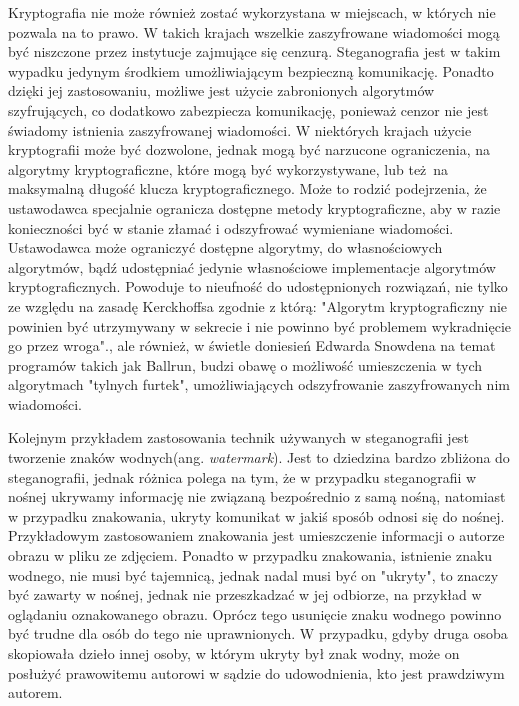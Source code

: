 \documentclass[a4paper, twoside, 12pt]{report}
\begin{document}
        Kryptografia nie może również zostać wykorzystana w miejscach, w których
        nie pozwala na to prawo.\cite{CRYPTOGRAFYLAW} W takich krajach wszelkie
        zaszyfrowane wiadomości mogą być niszczone przez instytucje zajmujące się
        cenzurą. Steganografia jest w takim
        wypadku jedynym środkiem umożliwiającym bezpieczną komunikację. Ponadto
        dzięki jej zastosowaniu, możliwe jest użycie zabronionych algorytmów szyfrujących,
        co dodatkowo zabezpiecza komunikację, ponieważ cenzor nie jest świadomy
        istnienia zaszyfrowanej wiadomości. W niektórych krajach użycie kryptografii
        może być dozwolone, jednak mogą być narzucone ograniczenia, na algorytmy
        kryptograficzne, które mogą być wykorzystywane, lub też na maksymalną
        długość klucza kryptograficznego. Może to rodzić podejrzenia, że ustawodawca
        specjalnie ogranicza dostępne metody kryptograficzne, aby w razie konieczności
        być w stanie złamać i odszyfrować wymieniane wiadomości. Ustawodawca
        może ograniczyć dostępne algorytmy, do własnościowych algorytmów, bądź
        udostępniać jedynie własnościowe implementacje algorytmów kryptograficznych.
        Powoduje to nieufność do udostępnionych rozwiązań, nie tylko ze względu
        na zasadę Kerckhoffsa zgodnie z którą:
        "Algorytm kryptograficzny nie powinien być utrzymywany w sekrecie i nie powinno
        być problemem wykradnięcie go przez wroga".\cite{KERCKHOS}, ale również,
        w świetle doniesień Edwarda Snowdena na temat programów takich jak
        Ballrun\cite{WIKI:BALLRUN}, budzi obawę o możliwość umieszczenia w tych
        algorytmach "tylnych furtek", umożliwiających odszyfrowanie zaszyfrowanych
        nim wiadomości.

        Kolejnym przykładem zastosowania technik używanych w steganografii jest
        tworzenie znaków wodnych(ang. \emph{watermark}). Jest to dziedzina bardzo zbliżona do steganografii,
        jednak różnica polega na tym, że w przypadku steganografii w nośnej ukrywamy
        informację nie związaną bezpośrednio z samą nośną, natomiast w przypadku znakowania,
        ukryty komunikat w jakiś sposób odnosi się do nośnej. Przykładowym zastosowaniem
        znakowania jest umieszczenie informacji o autorze obrazu w pliku ze zdjęciem.
        Ponadto w przypadku znakowania, istnienie znaku wodnego, nie musi być tajemnicą,
        jednak nadal musi być on "ukryty", to znaczy być zawarty w nośnej, jednak
        nie przeszkadzać w jej odbiorze, na przykład w oglądaniu oznakowanego obrazu.
        Oprócz tego usunięcie znaku wodnego powinno być trudne dla osób do tego nie
        uprawnionych. W przypadku, gdyby druga osoba skopiowała dzieło innej osoby,
        w którym ukryty był znak wodny, może on posłużyć prawowitemu autorowi w
        sądzie do udowodnienia, kto jest prawdziwym autorem.
\end{document}
